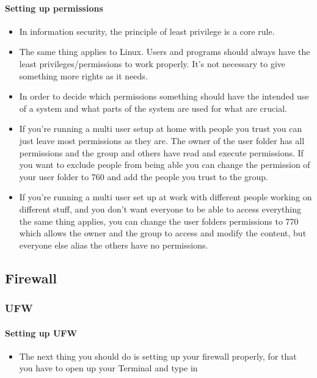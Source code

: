 \documentclass[a4paper,10pt]{article}
\begin{document}
\paragraph{Setting up permissions}
\begin{itemize}[leftmargin=*]
\item In information security, the principle of least privilege is a core rule. 
\item The same thing applies to Linux. Users and programs should always have the least privileges/permissions to work properly. It's not necessary to give something more rights as it needs. 
\item In order to decide which permissions something should have the intended use of a system and what parts of the system are used for what are crucial.
\item If you're running a multi user setup at home with people you trust you can just leave most permissions as they are. The owner of the user folder has all permissions and the group and others have read and execute permissions. If you want to exclude people from being able you can change the permission of your user folder to 760 and add the people you trust to the group. 
\item If you're running a multi user set up at work with different people working on different stuff, and you don't want everyone to be able to access everything the same thing applies, you can change the user folders permissions to 770 which allows the owner and the group to access and modify the content, but everyone else alias the others have no permissions.
\end{itemize}

\subsection{Firewall}

\subsubsection{UFW}
\paragraph{Setting up UFW}

\begin{itemize}[leftmargin=*]
\item The next thing you should do is setting up your firewall properly, for that you have to open up your Terminal and type in
\end{itemize}
\end{document}
